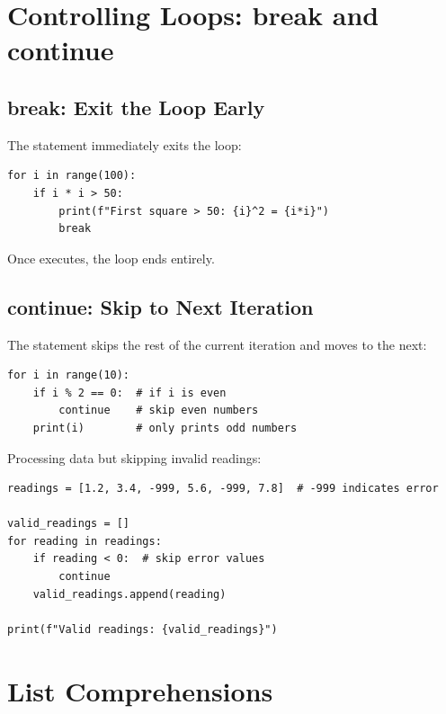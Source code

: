 \section{Controlling Loops: break and continue}
\label{sec:break-continue}

\subsection{break: Exit the Loop Early}

The  statement immediately exits the loop:

\begin{lstlisting}
for i in range(100):
    if i * i > 50:
        print(f"First square > 50: {i}^2 = {i*i}")
        break
\end{lstlisting}

Once  executes, the loop ends entirely.

\subsection{continue: Skip to Next Iteration}

The  statement skips the rest of the current iteration and moves to the next:

\begin{lstlisting}
for i in range(10):
    if i % 2 == 0:  # if i is even
        continue    # skip even numbers
    print(i)        # only prints odd numbers
\end{lstlisting}

\begin{labexample}
Processing data but skipping invalid readings:

\begin{lstlisting}
readings = [1.2, 3.4, -999, 5.6, -999, 7.8]  # -999 indicates error

valid_readings = []
for reading in readings:
    if reading < 0:  # skip error values
        continue
    valid_readings.append(reading)

print(f"Valid readings: {valid_readings}")
\end{lstlisting}
\end{labexample}

\section{List Comprehensions}
\label{sec:list-comprehensions}

